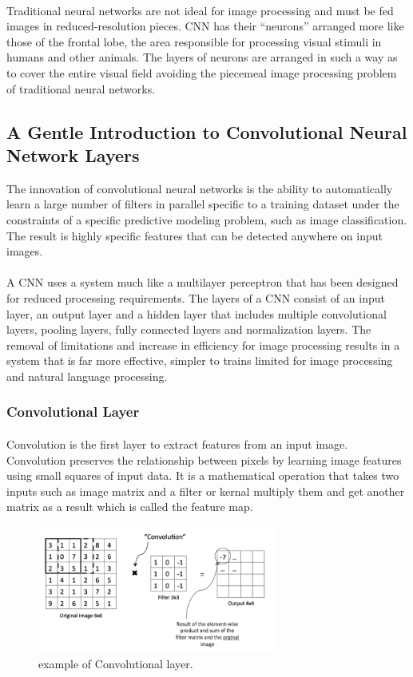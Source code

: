 \paragraph{}
Traditional neural networks are not ideal for image processing and must be fed images in reduced-resolution pieces. CNN has their “neurons” arranged more like those of the frontal lobe, the area responsible for processing visual stimuli in humans and other animals. The layers of neurons are arranged in such a way as to cover the entire visual field avoiding the piecemeal image processing problem of traditional neural networks.

\subsection{A Gentle Introduction to Convolutional Neural Network Layers }   
The innovation of convolutional neural networks is the ability to automatically learn a large number of filters in parallel specific to a training dataset under the constraints of a specific predictive modeling problem, such as image classification. The result is highly specific features that can be detected anywhere on input images.
\paragraph{}
A CNN uses a system much like a multilayer perceptron that has been designed for reduced processing requirements. The layers of a CNN consist of an input layer, an output layer and a hidden layer that includes multiple convolutional layers, pooling layers, fully connected layers and normalization layers. The removal of limitations and increase in efficiency for image processing results in a system that is far more effective, simpler to trains limited for image processing and natural language processing.
\subsubsection{Convolutional Layer}
\paragraph{}
Convolution is the first layer to extract features from an input image. Convolution preserves the relationship between pixels by learning image features using small squares of input data. It is a mathematical operation that takes two inputs such as image matrix and a filter or kernal multiply them and get another matrix as a result which  is called the feature map.
\begin{figure}
	\centering
	\includegraphics[width=0.7\textwidth]{conv_layer.png}
	\caption{example of Convolutional layer.}
\end{figure}
